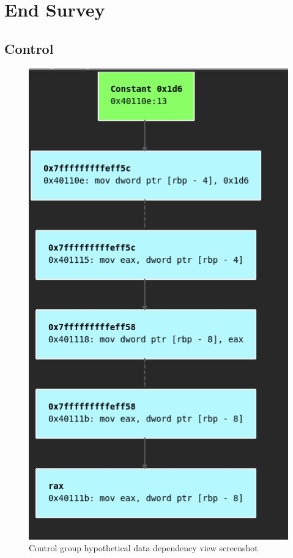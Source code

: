 \section{End Survey}
\subsection{Control}
 \begin{figure}[!hb]
        \centering
        \includegraphics[scale=0.4]{images/surveyddg.png}
        \caption{Control group hypothetical data dependency view screenshot}
        \label{fig:surveyddg}
\end{figure}
